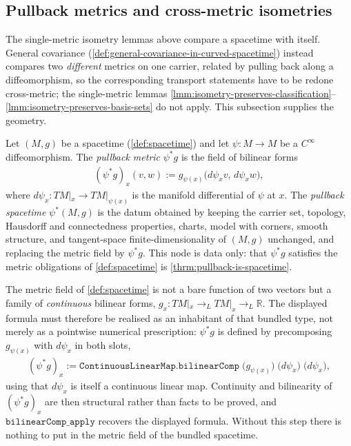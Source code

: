 \subsection{Pullback metrics and cross-metric isometries}

The single-metric isometry lemmas above compare a spacetime with itself. General covariance (\ref{def:general-covariance-in-curved-spacetime}) instead compares two \emph{different} metrics on one carrier, related by pulling back along a diffeomorphism, so the corresponding transport statements have to be redone cross-metric; the single-metric lemmas \ref{lmm:isometry-preserves-classification}--\ref{lmm:isometry-preserves-basis-sets} do not apply. This subsection supplies the geometry.

\begin{definition}
    \label{def:pullback-metric}
    Let $(M,g)$ be a spacetime (\ref{def:spacetime}) and let $\psi : M \to M$ be a $C^\infty$ diffeomorphism. The \emph{pullback metric} $\psi^*g$ is the field of bilinear forms
    \begin{align}
        (\psi^*g)_x(v,w) := g_{\psi(x)}\big(d\psi_x v,\, d\psi_x w\big),
    \end{align}
    where $d\psi_x : TM|_x \to TM|_{\psi(x)}$ is the manifold differential of $\psi$ at $x$. The \emph{pullback spacetime} $\psi^*(M,g)$ is the datum obtained by keeping the carrier set, topology, Hausdorff and connectedness properties, charts, model with corners, smooth structure, and tangent-space finite-dimensionality of $(M,g)$ unchanged, and replacing the metric field by $\psi^*g$. This node is data only: that $\psi^*g$ satisfies the metric obligations of \ref{def:spacetime} is \ref{thrm:pullback-is-spacetime}.

    The metric field of \ref{def:spacetime} is not a bare function of two vectors but a family of \emph{continuous} bilinear forms, $g_x : TM|_x \to_L TM|_x \to_L \mathbb{R}$. The displayed formula must therefore be realised as an inhabitant of that bundled type, not merely as a pointwise numerical prescription: $\psi^*g$ is defined by precomposing $g_{\psi(x)}$ with $d\psi_x$ in both slots,
    \begin{align}
        (\psi^*g)_x := \mathtt{ContinuousLinearMap.bilinearComp}\;\big(g_{\psi(x)}\big)\;\big(d\psi_x\big)\;\big(d\psi_x\big),
    \end{align}
    using that $d\psi_x$ is itself a continuous linear map. Continuity and bilinearity of $(\psi^*g)_x$ are then structural rather than facts to be proved, and $\mathtt{bilinearComp\_apply}$ recovers the displayed formula. Without this step there is nothing to put in the metric field of the bundled spacetime.
\end{definition}

